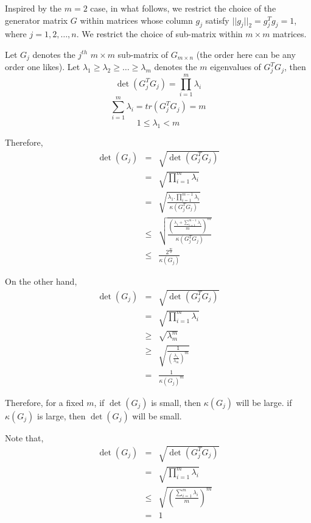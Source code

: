 \documentclass{sig-alternate}
\begin{document}
Inspired by the $m=2$ case, in what follows, we restrict the choice of the generator matrix $G$ within 
matrices whose column $g_j$ satisfy $||g_j||_2=g_j^T g_j=1$, where $j=1,2, \ldots, n$.
We restrict the choice of sub-matrix within $m \times m$ matrices. 

Let $G_j$ denotes the $j^{th} $ $ m \times m$  sub-matrix of $G_{m \times n}$ 
(the order here can be any order one likes). 
Let $\lambda_1 \geq \lambda_2 \geq \ldots \geq \lambda_m $ denotes the $m$ eigenvalues of $G_j^TG_j$, then
$$\det {(G_j^TG_j)} = \prod_{i=1}^m  \lambda_i$$
$$\sum_{i=1}^m \lambda_i = tr(G_j^TG_j)=m$$
$$1 \leq  \lambda_1 < m$$


Therefore,
\begin{eqnarray*}
\det (G_j)
&=& \sqrt {\det ( G_j^T G_j  ) }  \\
&=& \sqrt {\prod_{i=1}^m \lambda_i  }   \\
&=& \sqrt { \frac{\lambda_1 .  \prod_{i=1}^{m-1} \lambda_i }
{\kappa (G_j^T G_j )  }  }       \\
&\leq& \sqrt {\frac{ \left( \frac{\lambda_1 + \sum_{i=1}^{m-1} \lambda_i} {m} \right)^m}  {\kappa (G_j^T G_j )  }  }    \\
&\leq&  \frac{ 2^{\frac{m}{2} }}  {\kappa (G_j) }         
\end{eqnarray*}

On the other hand,
\begin{eqnarray*}
\det (G_j) 
&=& \sqrt {\det ( G_j^T G_j  ) }  \\
&=& \sqrt {\prod_{i=1}^m \lambda_i  }   \\
&\geq& \sqrt { \lambda_m^m }     \\
&\geq& \sqrt { \frac{1}
{\left(\frac{\lambda_1}{\lambda_m} \right)^m}  }  \\
&=&  \frac{1}{\kappa(G_j)^m}         
\end{eqnarray*}

Therefore, for a fixed $m$,
if $\det (G_j)$ is small, then $\kappa (G_j)$ will be large.
if  $\kappa (G_j)$  is large, then  $\det (G_j)$ will be small.



Note that,
\begin{eqnarray*}
\det ( G_j ) 
&=& \sqrt {\det ( G_j^T G_j  ) }  \\
&=& \sqrt { \prod_{i=1}^m \lambda_i  }   \\
&\leq&  \sqrt { \left( \frac{\sum_{i=1}^{m} \lambda_i} {m} \right)^m  }  \\
&=&1
\end{eqnarray*}
\end{document}
